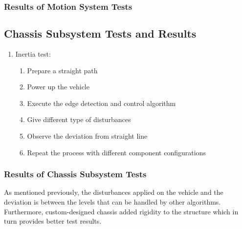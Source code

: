 \documentclass[a4paper,12pt]{article}
\begin{document}
\subsubsection*{Results of Motion System Tests}








\subsection {Chassis Subsystem Tests and Results}
\begin{enumerate}

\item Inertia test: 

\begin{enumerate}

\item Prepare a straight path

\item Power up the vehicle 

\item Execute the edge detection and control algorithm

\item Give different type of disturbances 

\item Observe the deviation from straight line

\item Repeat the process with different component configurations

\end{enumerate} 

\end{enumerate}


\subsubsection*{Results of Chassis Subsystem Tests}

As mentioned previously, the disturbances applied on the vehicle and the deviation is between the levels that can be handled by other algorithms. Furthermore, custom-designed chassis added rigidity to the structure which in turn provides better test results.
\end{document}
